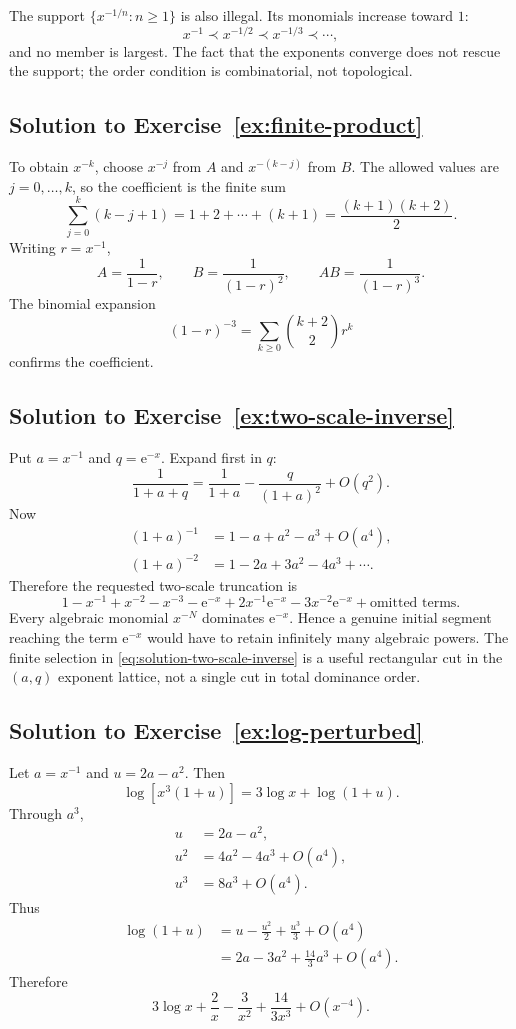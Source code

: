 \documentclass[11pt,oneside]{book}
\theoremstyle{definition}
\theoremstyle{remark}
\newcommand{\e}{\mathrm{e}}
\newcommand{\bigO}{O}
\newcommand{\precdom}{\prec}
\begin{document}
The support $\{x^{-1/n}:n\ge1\}$ is also illegal. Its monomials increase toward
$1$:
\[
  x^{-1}\precdom x^{-1/2}\precdom x^{-1/3}\precdom\cdots,
\]
and no member is largest. The fact that the exponents converge does not rescue
the support; the order condition is combinatorial, not topological.

\subsection*{Solution to Exercise~\ref{ex:finite-product}}

To obtain $x^{-k}$, choose $x^{-j}$ from $A$ and $x^{-(k-j)}$ from $B$. The
allowed values are $j=0,\ldots,k$, so the coefficient is the finite sum
\[
  \sum_{j=0}^k(k-j+1)
  =1+2+\cdots+(k+1)
  =\frac{(k+1)(k+2)}2.
\]
Writing $r=x^{-1}$,
\[
  A=\frac1{1-r},
  \qquad B=\frac1{(1-r)^2},
  \qquad AB=\frac1{(1-r)^3}.
\]
The binomial expansion
\[
  (1-r)^{-3}=\sum_{k\ge0}\binom{k+2}{2}r^k
\]
confirms the coefficient.

\subsection*{Solution to Exercise~\ref{ex:two-scale-inverse}}

Put $a=x^{-1}$ and $q=\e^{-x}$. Expand first in $q$:
\[
  \frac1{1+a+q}
  =\frac1{1+a}-\frac{q}{(1+a)^2}+\bigO(q^2).
\]
Now
\begin{align*}
  (1+a)^{-1}&=1-a+a^2-a^3+\bigO(a^4),\\
  (1+a)^{-2}&=1-2a+3a^2-4a^3+\cdots.
\end{align*}
Therefore the requested two-scale truncation is
\begin{equation}
  1-x^{-1}+x^{-2}-x^{-3}
  -\e^{-x}+2x^{-1}\e^{-x}-3x^{-2}\e^{-x}
  +\text{omitted terms}.
  \label{eq:solution-two-scale-inverse}
\end{equation}
Every algebraic monomial $x^{-N}$ dominates $\e^{-x}$. Hence a genuine initial
segment reaching the term $\e^{-x}$ would have to retain infinitely many
algebraic powers. The finite selection in
\eqref{eq:solution-two-scale-inverse} is a useful rectangular cut in the
$(a,q)$ exponent lattice, not a single cut in total dominance order.

\subsection*{Solution to Exercise~\ref{ex:log-perturbed}}

Let $a=x^{-1}$ and $u=2a-a^2$. Then
\[
  \log\left[x^3(1+u)\right]=3\log x+\log(1+u).
\]
Through $a^3$,
\begin{align*}
  u&=2a-a^2,\\
  u^2&=4a^2-4a^3+\bigO(a^4),\\
  u^3&=8a^3+\bigO(a^4).
\end{align*}
Thus
\begin{align*}
  \log(1+u)
  &=u-\frac{u^2}{2}+\frac{u^3}{3}+\bigO(a^4)\\
  &=2a-3a^2+\frac{14}{3}a^3+\bigO(a^4).
\end{align*}
Therefore
\[
  \boxed{
  3\log x+\frac2x-\frac3{x^2}+\frac{14}{3x^3}
  +\bigO(x^{-4})}.
\]
\end{document}
